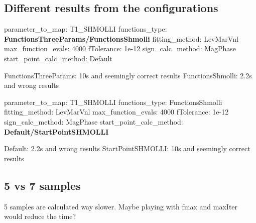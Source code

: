 \subsection*{Different results from the configurations}

parameter\-\_\-to\-\_\-map\-: T1\-\_\-\-S\-H\-M\-O\-L\-L\-I functions\-\_\-type\-: {\bfseries Functions\-Three\-Params/\-Functions\-Shmolli} fitting\-\_\-method\-: Lev\-Mar\-Vnl max\-\_\-function\-\_\-evals\-: 4000 f\-Tolerance\-: 1e-\/12 sign\-\_\-calc\-\_\-method\-: Mag\-Phase start\-\_\-point\-\_\-calc\-\_\-method\-: Default

Functions\-Three\-Params\-: 10s and seemingly correct results Functions\-Shmolli\-: 2.\-2s and wrong results

parameter\-\_\-to\-\_\-map\-: T1\-\_\-\-S\-H\-M\-O\-L\-L\-I functions\-\_\-type\-: Functions\-Shmolli fitting\-\_\-method\-: Lev\-Mar\-Vnl max\-\_\-function\-\_\-evals\-: 4000 f\-Tolerance\-: 1e-\/12 sign\-\_\-calc\-\_\-method\-: Mag\-Phase start\-\_\-point\-\_\-calc\-\_\-method\-: {\bfseries Default/\-Start\-Point\-S\-H\-M\-O\-L\-L\-I}

Default\-: 2.\-2s and wrong results Start\-Point\-S\-H\-M\-O\-L\-L\-I\-: 10s and seemingly correct results

\subsection*{5 vs 7 samples}

5 samples are calculated way slower. Maybe playing with fmax and max\-Iter would reduce the time? 